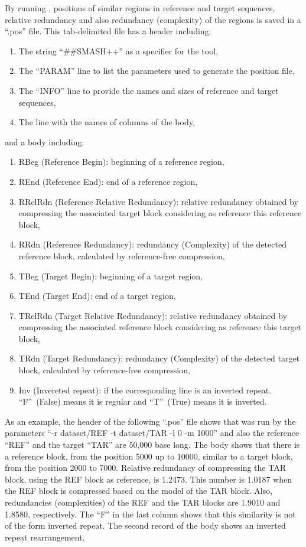 \documentclass[a4paper,9pt]{extarticle}
\newcommand*{\method}[1]{\text{#1}\xspace}
\newcommand*{\smashpp}   {\method{Smash++}}
\begin{document}
By running \smashpp, positions of similar regions in reference and target sequences, relative redundancy and also redundancy (complexity) of the regions is saved in a ``.pos'' file. This tab-delimited file has a header including:
\begin{enumerate}
  \item The string ``\#\#SMASH++'' as a specifier for the \smashpp tool,
  \item The ``PARAM'' line to list the parameters used to generate the position file,
  \item The ``INFO'' line to provide the names and sizes of reference and target sequences,
  \item The line with the names of columns of the body,
\end{enumerate}
and a body including:
\begin{enumerate}
  \item RBeg (Reference Begin): beginning of a reference region,
  \item REnd (Reference End): end of a reference region,
  \item RRelRdn (Reference Relative Redundancy): relative redundancy obtained by compressing the associated target block considering as reference this reference block,
  \item RRdn (Reference Redundancy): redundancy (Complexity) of the detected reference block, calculated by reference-free compression,
  \item TBeg (Target Begin): beginning of a target region,
  \item TEnd (Target End): end of a target region,
  \item TRelRdn (Target Relative Redundancy): relative redundancy obtained by compressing the associated reference block considering as reference this target block,
  \item TRdn (Target Redundancy): redundancy (Complexity) of the detected target block, calculated by reference-free compression,
  \item Inv (Invereted repeat): if the corresponding line is an inverted repeat. ``F''~(False) means it is regular and ``T''~(True) means it is inverted.
\end{enumerate}
As an example, the header of the following ``.pos'' file shows that \smashpp was run by the parameters ``-r dataset/REF -t dataset/TAR -l 0 -m 1000'' and also the reference ``REF'' and the target ``TAR'' are 50,000 base long. The body shows that there is a reference block, from the position 5000 up to 10000, similar to a target block, from the position 2000 to 7000. Relative redundancy of compressing the TAR block, using the REF block as reference, is 1.2473. This number is 1.0187 when the REF block is compressed based on the model of the TAR block. Also, redundancies (complexities) of the REF and the TAR blocks are 1.9010 and 1.8580, respectively. The ``F'' in the last column shows that this similarity is not of the form inverted repeat. The second record of the body shows an inverted repeat rearrangement.
\end{document}
